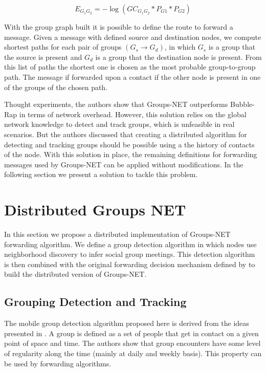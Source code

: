 \begin{equation}
	\label{eq:edgeWeight}
    E_{G_1G_2} = -\log(GC_{G_1G_2} * P_{G1} * P_{G2})
\end{equation}

With the group graph built it is possible to define the route to forward a message. Given a message with defined source and destination nodes, we compute shortest paths for each pair of groups $(G_s \rightarrow G_d)$, in which $G_s$ is a group that the source is present and $G_d$ is a group that the destination node is present. From this list of paths the shortest one is chosen as the most probable group-to-group path. The message if forwarded upon a contact if the other node is present in one of the groups of the chosen path.

Thought experiments, the authors show that Groups-NET outperforms Bubble-Rap in terms of network overhead. However, this solution relies on the global network knowledge to detect and track groups, which is unfeasible in real scenarios. But the authors discussed that creating a distributed algorithm for detecting and tracking groups should be possible using a the history of contacts of the node. With this solution in place, the remaining definitions for forwarding messages used by Groups-NET can be applied without modifications. In the following section we present a solution to tackle this problem.

\section{Distributed Groups NET}
\label{sec:distributedGroupsNET}

In this section we propose a distributed implementation of Groups-NET forwarding algorithm. We define a group detection algorithm in which nodes use neighborhood discovery to infer social group meetings. This detection algorithm is then combined with the original forwarding decision mechanism defined by \citet{nunes2016leveraging} to build the distributed version of Groups-NET.

\subsection{Grouping Detection and Tracking}
\label{subsec:groupDetection}

The mobile group detection algorithm proposed here is derived from the ideas presented in \cite{groupMobility}. A group is defined as a set of people that get in contact on a given point of space and time. The authors show that group encounters have some level of regularity along the time (mainly at daily and weekly basis). This property can be used by forwarding algorithms.

